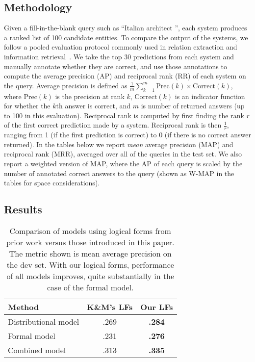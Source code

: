 \documentclass[11pt]{article}
\newcommand{\blank}{\underline{\hspace{.5cm}}}
\begin{document}
\subsection{Methodology}

Given a fill-in-the-blank query such as ``Italian architect
\blank{}'', each system produces a ranked list of 100 candidate
entities.  To compare the output of the systems, we follow a pooled
evaluation protocol commonly used in relation extraction and
information
retrieval~\cite{west-2014-kbc-via-qa,riedel-2013-mf-universal-schema}.
We take the top 30 predictions from each system and manually annotate
whether they are correct, and use those annotations to compute the
average precision (AP) and reciprocal rank (RR) of each system on the
query.  Average precision is defined as $\frac{1}{m}\sum^m_{k=1}
\mathrm{Prec}(k) \times \mathrm{Correct}(k)$, where $\mathrm{Prec}(k)$
is the precision at rank $k$, $\mathrm{Correct}(k)$ is an indicator
function for whether the $k$th answer is correct, and $m$ is number of
returned answers (up to 100 in this evaluation).  Reciprocal rank is
computed by first finding the rank $r$ of the first correct prediction
made by a system.  Reciprocal rank is then $\frac{1}{r}$, ranging from
1 (if the first prediction is correct) to 0 (if there is no correct
answer returned).  In the tables below we report \emph{mean} average
precision (MAP) and reciprocal rank (MRR), averaged over all of the
queries in the test set.  We also report a weighted version of MAP,
where the AP of each query is scaled by the number of annotated
correct answers to the query (shown as W-MAP in the tables for space
considerations).

\subsection{Results}

\begin{table}
  \centering
  {\small
    \begin{tabular}{lcc}
      \toprule
      Method & K\&M's LFs & Our LFs \\
      \midrule
      Distributional model & .269 & \textbf{.284} \\
      \midrule
      Formal model & .231 & \textbf{.276} \\
      \midrule
      Combined model & .313 & \textbf{.335} \\
      \bottomrule
    \end{tabular}
  }
  \caption{Comparison of models using logical forms from prior work
  versus those introduced in this paper.  The metric shown is mean
  average precision on the dev set.  With our logical forms,
  performance of all models improves, quite substantially in the case
  of the formal model.}
  \label{tab:better-lfs}
\end{table}
\end{document}

